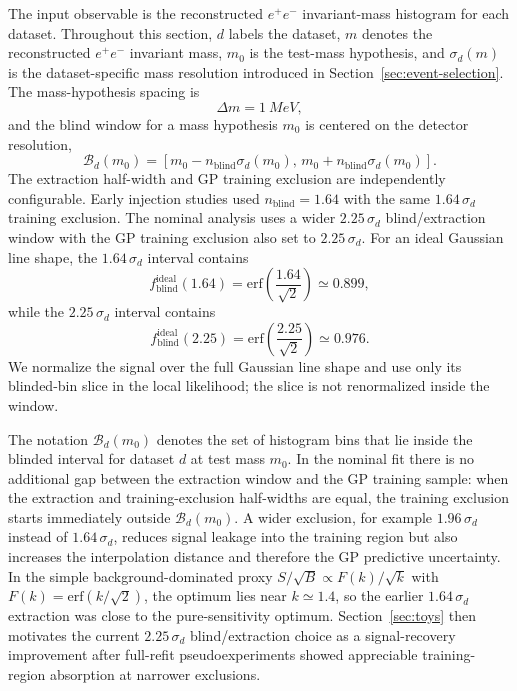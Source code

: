 The input observable is the reconstructed $e^+e^-$ invariant-mass histogram for each
dataset. Throughout this section, $d$ labels the dataset, $m$ denotes the reconstructed
$e^+e^-$ invariant mass, $m_0$ is the test-mass hypothesis, and $\sigma_d(m)$ is the
dataset-specific mass resolution introduced in
Section~\ref{sec:event-selection}. The mass-hypothesis spacing is
\begin{equation}
\Delta m = \SI{1}{MeV},
\end{equation}
and the blind window for a mass hypothesis $m_0$ is centered on the detector
resolution,
\begin{equation}
\mathcal{B}_d(m_0) =
\left[m_0 - n_{\mathrm{blind}}\sigma_d(m_0),\,
      m_0 + n_{\mathrm{blind}}\sigma_d(m_0)\right].
\end{equation}
The extraction half-width and GP training exclusion are independently configurable.
Early injection studies used
$n_{\mathrm{blind}}=1.64$ with the same $1.64\,\sigma_d$ training exclusion. The nominal
analysis uses a
wider $2.25\,\sigma_d$ blind/extraction window with the GP training exclusion also set
to $2.25\,\sigma_d$. For an ideal Gaussian line shape, the $1.64\,\sigma_d$ interval
contains
\begin{equation}
f_{\mathrm{blind}}^{\mathrm{ideal}}(1.64)
= \mathrm{erf}\!\left(\frac{1.64}{\sqrt{2}}\right)
\simeq 0.899,
\end{equation}
while the $2.25\,\sigma_d$ interval contains
\begin{equation}
f_{\mathrm{blind}}^{\mathrm{ideal}}(2.25)
= \mathrm{erf}\!\left(\frac{2.25}{\sqrt{2}}\right)
\simeq 0.976.
\end{equation}
We normalize the signal over the full Gaussian line shape and use only its blinded-bin
slice in the local likelihood; the slice is not renormalized inside the window.

The notation $\mathcal{B}_d(m_0)$ denotes the set of histogram bins that lie inside the
blinded interval for dataset $d$ at test mass $m_0$. In the nominal fit there is no
additional gap between the extraction window and the GP
training sample: when the extraction and training-exclusion half-widths are equal, the
training exclusion starts immediately outside $\mathcal{B}_d(m_0)$. A wider exclusion,
for example $1.96\,\sigma_d$ instead of $1.64\,\sigma_d$, reduces signal leakage into
the training region but also increases the interpolation distance and therefore the GP
predictive uncertainty. In the simple background-dominated proxy
$S/\sqrt{B}\propto F(k)/\sqrt{k}$ with $F(k)=\mathrm{erf}(k/\sqrt{2})$, the optimum lies
near $k\simeq1.4$, so the earlier $1.64\,\sigma_d$ extraction was close to the
pure-sensitivity optimum. Section~\ref{sec:toys} then motivates the current
$2.25\,\sigma_d$ blind/extraction choice as a signal-recovery improvement after
full-refit pseudoexperiments showed appreciable training-region absorption at narrower
exclusions.

